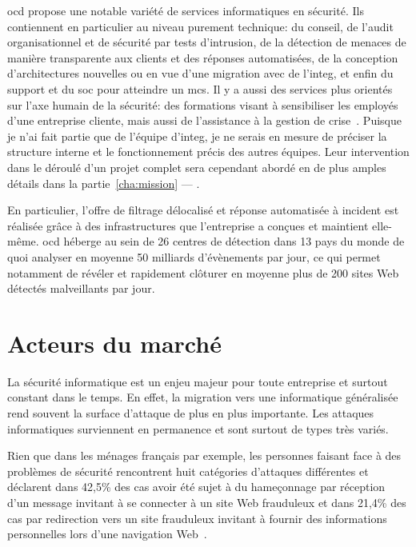 \documentclass[12pt, oneside, a4paper, titlepage]{report}
\begin{document}
\acrlong{ocd} propose une notable variété de services informatiques en sécurité.
Ils contiennent en particulier au niveau purement technique: du conseil, de
l'audit organisationnel et de sécurité par tests d'intrusion, de la détection de
menaces de manière transparente aux clients et des réponses automatisées, de la
conception d'architectures nouvelles ou en vue d'une migration avec de
l'\gls{integ}, et enfin du support et du \gls{soc} pour atteindre un \gls{mcs}.
Il y a aussi des services plus orientés sur l'axe humain de la sécurité: des
formations visant à sensibiliser les employés d'une entreprise cliente, mais
aussi de l'assistance à la gestion de crise~\cite{ocd}.  Puisque je n'ai fait
partie que de l'équipe d'\gls{integ}, je ne serais en mesure de préciser la
structure interne et le fonctionnement précis des autres équipes. Leur
intervention dans le déroulé d'un projet complet sera cependant abordé en de
plus amples détails dans la partie~\ref{cha:mission} --- .

En particulier, l'offre de filtrage délocalisé et réponse automatisée à incident
est réalisée grâce à des infrastructures que l'entreprise a conçues et maintient
elle-même. \acrlong{ocd} héberge au sein de 26 centres de détection dans 13 pays
du monde de quoi analyser en moyenne 50 milliards d'évènements par jour, ce qui
permet notamment de révéler et rapidement clôturer en moyenne plus de 200 sites
Web détectés malveillants par jour.


\section{Acteurs du marché}%
\label{sec:intro::acteurs}

La sécurité informatique est un enjeu majeur pour toute entreprise et surtout
constant dans le temps. En effet, la migration vers une informatique généralisée
rend souvent la surface d'attaque de plus en plus importante. Les attaques
informatiques surviennent en permanence et sont surtout de types très variés.

Rien que dans les ménages français par exemple, les personnes faisant face à des
problèmes de sécurité rencontrent huit catégories d'attaques différentes et
déclarent dans 42,5\% des cas avoir été sujet à du hameçonnage par réception
d'un message invitant à se connecter à un site Web frauduleux et dans 21,4\% des
cas par redirection vers un site frauduleux invitant à fournir des informations
personnelles lors d'une navigation Web~\cite{attack-types}.
\end{document}
